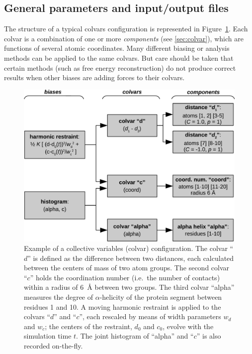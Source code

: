 \subsection{General parameters and input/output files}
\label{sec:colvarmodule}

The structure of a typical colvars configuration is represented in
Figure~\ref{fig:colvars_diagram}.  Each colvar is a combination of one
or more \emph{components} (see \ref{sec:colvar}), which are functions
of several atomic coordinates.  Many different biasing or analysis
methods can be applied to the same colvars.  But care should be taken
that certain methods (such as free energy reconstruction) do not
produce correct results when other biases are adding forces to their
colvars.

\begin{figure}[!ht]
  \centering
  \includegraphics[width=12cm]{figures/colvars_diagram}
  \caption{Example of a collective variables (colvar) configuration.
    The colvar ``$d$'' is defined as the difference between two
    distances, each calculated between the centers of mass of two
    atom groups.  The second colvar ``$c$'' holds the coordination
    number (i.e.~the number of contacts) within a radius of 6~\AA{}
    between two groups.  The third colvar ``alpha'' measures the
    degree of $\alpha$-helicity of the protein segment between
    residues 1 and 10. A moving harmonic restraint is applied to the
    colvars ``$d$'' and ``$c$'', each rescaled by means of width
    parameters $w_{d}$ and $w_{c}$; the centers of the restraint,
    $d_0$ and $c_0$, evolve with the simulation time $t$. The joint
    histogram of ``alpha'' and ``$c$'' is also recorded on-the-fly.}
  \label{fig:colvars_diagram}
\end{figure}


